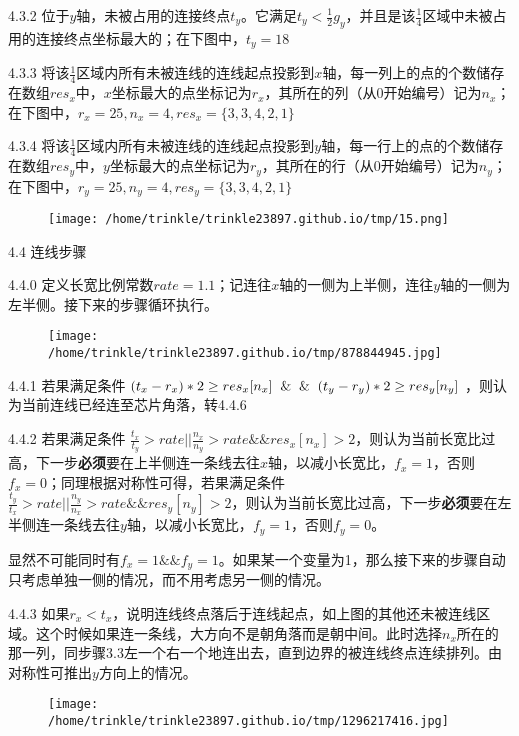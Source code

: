 \documentclass[]{article}
\begin{document}
\begin{enumerate}
   4.3.2
  位于\(y\)轴，未被占用的连接终点\(t_y\)。它满足\(t_y<\frac{1}{2}g_y\)，并且是该\(\frac{1}{4}\)区域中未被占用的连接终点坐标最大的；在下图中，\(t_y=18\)

   4.3.3
  将该\(\frac{1}{4}\)区域内所有未被连线的连线起点投影到\(x\)轴，每一列上的点的个数储存在数组\(res_x\)中，\(x\)坐标最大的点坐标记为\(r_x\)，其所在的列（从0开始编号）记为\(n_x\)；在下图中，\(r_x=25,n_x=4,res_x=\{3,3,4,2,1\}\)

   4.3.4
  将该\(\frac{1}{4}\)区域内所有未被连线的连线起点投影到\(y\)轴，每一行上的点的个数储存在数组\(res_y\)中，\(y\)坐标最大的点坐标记为\(r_y\)，其所在的行（从0开始编号）记为\(n_y\)；在下图中，\(r_y=25,n_y=4,res_y=\{3,3,4,2,1\}\)

  \begin{figure}[htbp]
  \centering
  \texttt{[image: /home/trinkle/trinkle23897.github.io/tmp/15.png]}
  \caption{}
  \end{figure}

  4.4 连线步骤

   4.4.0
  定义长宽比例常数\(rate=1.1\)；记连往\(x\)轴的一侧为上半侧，连往\(y\)轴的一侧为左半侧。接下来的步骤循环执行。

  \begin{figure}[htbp]
  \centering
  \texttt{[image: /home/trinkle/trinkle23897.github.io/tmp/878844945.jpg]}
  \caption{}
  \end{figure}

   4.4.1 若果满足条件
  \((t_x-r_x)*2\ge res_x[n_x]\And\And (t_y-r_y)*2\ge res_y[n_y]\)
  ，则认为当前连线已经连至芯片角落，转4.4.6

   4.4.2 若果满足条件
  \(\frac{t_x}{t_y}>rate || \frac{n_x}{n_y}>rate\&\&res_x[n_x]>2\)，则认为当前长宽比过高，下一步\textbf{必须}要在上半侧连一条线去往\(x\)轴，以减小长宽比，\(f_x=1\)，否则\(f_x=0\)；同理根据对称性可得，若果满足条件
  \(\frac{t_y}{t_x}>rate || \frac{n_y}{n_x}>rate\&\&res_y[n_y]>2\)，则认为当前长宽比过高，下一步\textbf{必须}要在左半侧连一条线去往\(y\)轴，以减小长宽比，\(f_y=1\)，否则\(f_y=0\)。


  显然不可能同时有\(f_x=1\&\&f_y=1\)。如果某一个变量为1，那么接下来的步骤自动只考虑单独一侧的情况，而不用考虑另一侧的情况。

   4.4.3
  如果\(r_x<t_x\)，说明连线终点落后于连线起点，如上图的其他还未被连线区域。这个时候如果连一条线，大方向不是朝角落而是朝中间。此时选择\(n_x\)所在的那一列，同步骤3.3左一个右一个地连出去，直到边界的被连线终点连续排列。由对称性可推出\(y\)方向上的情况。

  \begin{figure}[htbp]
  \centering
  \texttt{[image: /home/trinkle/trinkle23897.github.io/tmp/1296217416.jpg]}
  \caption{}
  \end{figure}


\end{enumerate}
\end{document}

